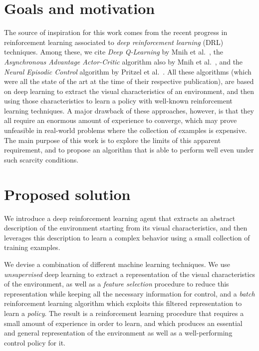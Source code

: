 \section{Goals and motivation}
The source of inspiration for this work comes from the recent progress in 
reinforcement learning associated to \textit{deep reinforcement learning} (DRL)
techniques. 
Among these, we cite \textit{Deep Q-Learning} by Mnih et al.\ \cite{mnih2015human},
the \textit{Asynchronous Advantage Actor-Critic} algorithm also by Mnih et 
al.\ \cite{mnih2016asynchronous}, and the \textit{Neural Episodic Control} 
algorithm by Pritzel et al.\ \cite{pritzel2017neural}.
All these algorithms (which were all the state of the art at the time of
their respective publication), are based on deep learning to extract 
the visual characteristics of an environment, and then using those 
characteristics to learn a policy with well-known reinforcement learning 
techniques. A major drawback of these approaches, however, is that they all 
require an enormous amount of experience to converge, which may prove unfeasible
in real-world problems where the collection of examples is expensive.
The main purpose of this work is to explore the limits of this apparent 
requirement, and to propose an algorithm that is able to perform well even under 
such scarcity conditions.

\section{Proposed solution}
We introduce a deep reinforcement learning agent that extracts an abstract 
description of the environment starting from its visual characteristics, and 
then leverages this description to learn a complex behavior using a small 
collection of training examples.

We devise a combination of different machine learning techniques. We use 
\textit{unsupervised} deep learning to extract a representation of the visual 
characteristics of the environment, as well as a \textit{feature selection}
procedure to reduce this representation while keeping all the necessary 
information for control, and a \textit{batch} reinforcement learning algorithm 
which exploits this filtered representation to learn a \textit{policy}.
The result is a reinforcement learning procedure that requires a small amount
of experience in order to learn, and which produces an essential and 
general representation of the environment as well as a well-performing control 
policy for it.

